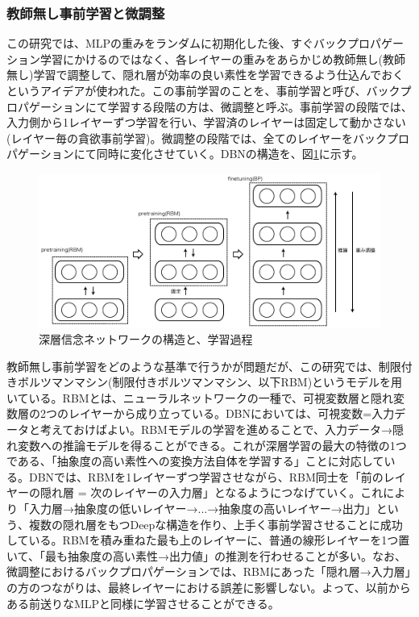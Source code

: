 \subsubsection{教師無し事前学習と微調整}
この研究では、MLPの重みをランダムに初期化した後、すぐバックプロパゲーション学習にかけるのではなく、各レイヤーの重みをあらかじめ教師無し(教師無し)学習で調整して、隠れ層が効率の良い素性を学習できるよう仕込んでおくというアイデアが使われた。この事前学習のことを、事前学習と呼び、バックプロパゲーションにて学習する段階の方は、微調整と呼ぶ。事前学習の段階では、入力側から1レイヤーずつ学習を行い、学習済のレイヤーは固定して動かさない(レイヤー毎の貪欲事前学習)。微調整の段階では、全てのレイヤーをバックプロパゲーションにて同時に変化させていく。DBNの構造を、図\ref{c3_dbn}に示す。\par
\begin{figure}[tbp]
 \centering
  \includegraphics[width=120mm]{img/c3/dbn}
 \caption{深層信念ネットワークの構造と、学習過程}
 \label{c3_dbn}
\end{figure}
教師無し事前学習をどのような基準で行うかが問題だが、この研究では、制限付きボルツマンマシン(制限付きボルツマンマシン、以下RBM)というモデルを用いている。RBMとは、ニューラルネットワークの一種で、可視変数層と隠れ変数層の2つのレイヤーから成り立っている。DBNにおいては、可視変数=入力データと考えておけばよい。RBMモデルの学習を進めることで、入力データ→隠れ変数への推論モデルを得ることができる。これが深層学習の最大の特徴の1つである、「抽象度の高い素性への変換方法自体を学習する」ことに対応している。DBNでは、RBMを1レイヤーずつ学習させながら、RBM同士を「前のレイヤーの隠れ層 = 次のレイヤーの入力層」となるようにつなげていく。これにより「入力層→抽象度の低いレイヤー→...→抽象度の高いレイヤー→出力」という、複数の隠れ層をもつDeepな構造を作り、上手く事前学習させることに成功している。RBMを積み重ねた最も上のレイヤーに、普通の線形レイヤーを1つ置いて、「最も抽象度の高い素性→出力値」の推測を行わせることが多い。なお、微調整におけるバックプロパゲーションでは、RBMにあった「隠れ層→入力層」の方のつながりは、最終レイヤーにおける誤差に影響しない。よって、以前からある前送りなMLPと同様に学習させることができる。
